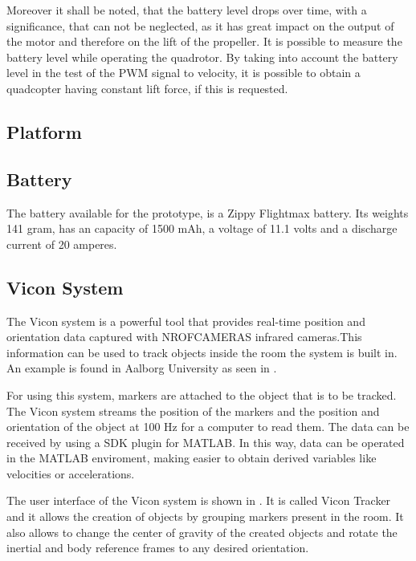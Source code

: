 Moreover it shall be noted, that the battery level drops over time, with a significance, that can not be neglected, as it has great impact on the output of the motor and therefore on the lift of the propeller. It is possible to measure the battery level while operating the quadrotor. By taking into account the battery level in the test of the PWM signal to velocity, it is possible to obtain a quadcopter having constant lift force, if this is requested. 

\subsection{Platform}

\subsection{Battery}

The battery available for the prototype, is a Zippy Flightmax battery. Its weights 141 gram, has an capacity of 1500 mAh, a voltage of 11.1 volts and a discharge current of 20 amperes. 


\subsection{Vicon System}

The Vicon system is a powerful tool that provides real-time position and orientation data captured with NROFCAMERAS infrared cameras.This information can be used to track objects inside the room the system is built in. An example is found in Aalborg University as seen in . 


For using this system, markers are attached to the object that is to be tracked. The Vicon system streams the position of the markers and the position and orientation of the object at 100 Hz for a computer to read them. The data can be received by using a SDK plugin for MATLAB. In this way, data can be operated in the MATLAB enviroment, making easier to obtain derived variables like velocities or accelerations.

The user interface of the Vicon system is shown in . It is called Vicon Tracker and it allows the creation of objects by grouping markers present in the room. It also allows to change the center of gravity of the created objects and rotate the inertial and body reference frames to any desired orientation.
